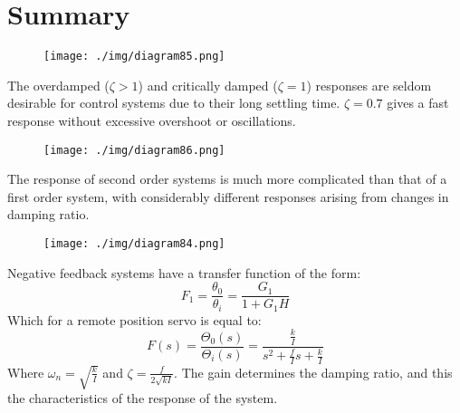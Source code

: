 \section{Summary}
\begin{figure}[H]
  \centering
  \texttt{[image: ./img/diagram85.png]}
\end{figure}
The overdamped ($\zeta > 1$) and critically damped ($\zeta = 1$) responses are seldom desirable for control systems due to their long settling time. $\zeta = 0.7$ gives a fast response without excessive overshoot or oscillations.
\begin{figure}[H]
  \centering
  \texttt{[image: ./img/diagram86.png]}
\end{figure}
The response of second order systems is much more complicated than that of a first order system, with considerably different responses arising from changes in damping ratio.
\begin{figure}[H]
  \centering
  \texttt{[image: ./img/diagram84.png]}
\end{figure}
Negative feedback systems have a transfer function of the form:
\begin{equation}
  F_1 = \frac{\theta_0}{\theta_i} = \frac{G_1}{1 + G_1 H}
\end{equation}
Which for a remote position servo is equal to:
\begin{equation}
  F(s) = \frac{\Theta_0 (s)}{\Theta_i (s)} = \frac{\frac{k}{I}}{s^2 + \frac{f}{I}s + \frac{k}{I}}
\end{equation}
Where $\omega_n = \sqrt{\frac{k}{I}}$ and $\zeta = \frac{f}{2\sqrt{kI}}$. The gain determines the damping ratio, and this the characteristics of the response of the system.
